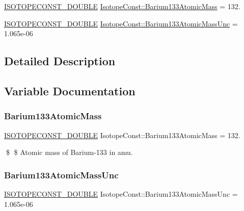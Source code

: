 \begin{DoxyCompactItemize}
\item 
\mbox{\hyperlink{group___isotope_const-_macros_ga8f45a7272ce02c0b4c65c44636ed719a}{I\+S\+O\+T\+O\+P\+E\+C\+O\+N\+S\+T\+\_\+\+D\+O\+U\+B\+LE}} \mbox{\hyperlink{group___isotope_const-_barium-_ba133_gad113744c4d57b40a08b969799fa72bee}{Isotope\+Const\+::\+Barium133\+Atomic\+Mass}} = 132.
\item 
\mbox{\hyperlink{group___isotope_const-_macros_ga8f45a7272ce02c0b4c65c44636ed719a}{I\+S\+O\+T\+O\+P\+E\+C\+O\+N\+S\+T\+\_\+\+D\+O\+U\+B\+LE}} \mbox{\hyperlink{group___isotope_const-_barium-_ba133_ga7b866580db6a87cf8e81029b8cd73913}{Isotope\+Const\+::\+Barium133\+Atomic\+Mass\+Unc}} = 1.\+065e-\/06
\end{DoxyCompactItemize}


\subsection{Detailed Description}


\subsection{Variable Documentation}
\mbox{\label{group___isotope_const-_barium-_ba133_gad113744c4d57b40a08b969799fa72bee}} 
\subsubsection{\texorpdfstring{Barium133\+Atomic\+Mass}{Barium133AtomicMass}}
{\footnotesize\ttfamily \mbox{\hyperlink{group___isotope_const-_macros_ga8f45a7272ce02c0b4c65c44636ed719a}{I\+S\+O\+T\+O\+P\+E\+C\+O\+N\+S\+T\+\_\+\+D\+O\+U\+B\+LE}} Isotope\+Const\+::\+Barium133\+Atomic\+Mass = 132.}

\$ \$ Atomic mass of Barium-\/133 in amu. \mbox{\label{group___isotope_const-_barium-_ba133_ga7b866580db6a87cf8e81029b8cd73913}} 
\subsubsection{\texorpdfstring{Barium133\+Atomic\+Mass\+Unc}{Barium133AtomicMassUnc}}
{\footnotesize\ttfamily \mbox{\hyperlink{group___isotope_const-_macros_ga8f45a7272ce02c0b4c65c44636ed719a}{I\+S\+O\+T\+O\+P\+E\+C\+O\+N\+S\+T\+\_\+\+D\+O\+U\+B\+LE}} Isotope\+Const\+::\+Barium133\+Atomic\+Mass\+Unc = 1.\+065e-\/06}

